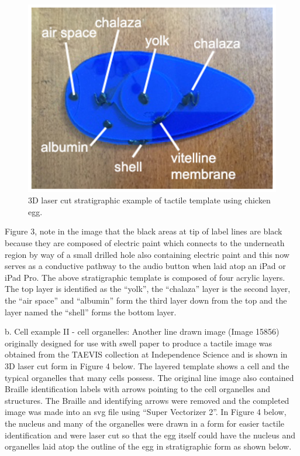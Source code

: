 \documentclass[11.5pt]{sig-alternate} %
\begin{document}
\begin{large}
\begin{figure}[h]
    \centering
    \includegraphics[width=1\linewidth]{fig 3.png}
    \caption{3D laser cut stratigraphic example of tactile template using chicken egg.}
\end{figure}
 
Figure 3, note in the image that the black areas at tip of label lines are black because they are composed of electric paint which connects to the underneath region by way of a small drilled hole also containing electric paint and this now serves as a conductive pathway to the audio button when laid atop an iPad or iPad Pro.  The above stratigraphic template is composed of four acrylic layers.  The top layer is identified as the “yolk”, the “chalaza” layer is the second layer, the “air space” and “albumin” form the third layer down from the top and the layer named the “shell” forms the bottom layer.
 
b. Cell example II - cell organelles: Another line drawn image (Image 15856) originally designed for use with swell paper to produce a tactile image was obtained from the TAEVIS collection at Independence Science and is shown in 3D laser cut form in Figure 4 below.  The layered template shows a cell and the typical organelles that many cells possess.  The original line image also contained Braille identification labels with arrows pointing to the cell organelles and structures.  The Braille and identifying arrows were removed and the completed image was made into an svg file using “Super Vectorizer 2”.  In Figure 4 below, the nucleus and many of the organelles were drawn in a form for easier tactile identification and were laser cut so that the egg itself could have the nucleus and organelles laid atop the outline of the egg in stratigraphic form as shown below.


\end{large}
\end{document}
